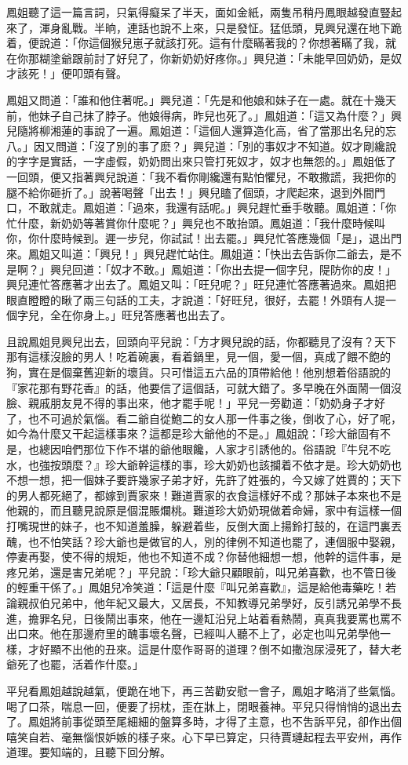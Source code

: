 鳳姐聽了這一篇言詞，只氣得癡呆了半天，面如金紙，兩隻吊稍丹鳳眼越發直豎起來了，渾身亂戰。半晌，連話也說不上來，只是發怔。猛低頭，見興兒還在地下跪着，便說道：「你這個猴兒崽子就該打死。這有什麼瞞著我的？你想著瞞了我，就在你那糊塗爺跟前討了好兒了，你新奶奶好疼你。」興兒道：「未能早回奶奶，是奴才該死！」便叩頭有聲。

鳳姐又問道：「誰和他住著呢。」興兒道：「先是和他娘和妹子在一處。就在十幾天前，他妹子自己抹了脖子。他娘得病，昨兒也死了。」鳳姐道：「這又為什麼？」興兒隨將柳湘蓮的事說了一遍。鳳姐道：「這個人還算造化高，省了當那出名兒的忘八。」因又問道：「沒了別的事了麽？」興兒道：「別的事奴才不知道。奴才剛纔說的字字是實話，一字虛假，奶奶問出來只管打死奴才，奴才也無怨的。」鳳姐低了一回頭，便又指著興兒說道：「我不看你剛纔還有點怕懼兒，不敢撒謊，我把你的腿不給你砸折了。」說著喝聲「出去！」興兒瞌了個頭，才爬起來，退到外間門口，不敢就走。鳳姐道：「過來，我還有話呢。」興兒趕忙垂手敬聽。鳳姐道：「你忙什麼，新奶奶等著賞你什麼呢？」興兒也不敢抬頭。鳳姐道：「我什麼時候叫你，你什麼時候到。遲一步兒，你試試！出去罷。」興兒忙答應幾個「是」，退出門來。鳳姐又叫道：「興兒！」興兒趕忙站住。鳳姐道：「快出去告訴你二爺去，是不是啊？」興兒回道：「奴才不敢。」鳳姐道：「你出去提一個字兒，隄防你的皮！」興兒連忙答應著才出去了。鳳姐又叫：「旺兒呢？」旺兒連忙答應著過來。鳳姐把眼直瞪瞪的瞅了兩三句話的工夫，才說道：「好旺兒，很好，去罷！外頭有人提一個字兒，全在你身上。」旺兒答應著也出去了。

且說鳳姐見興兒出去，回頭向平兒說：「方才興兒說的話，你都聽見了沒有？天下那有這樣沒臉的男人！吃着碗裏，看着鍋里，見一個，愛一個，真成了餵不飽的狗，實在是個棄舊迎新的壞貨。只可惜這五六品的頂帶給他！他別想着俗語說的『家花那有野花香』的話，他要信了這個話，可就大錯了。多早晚在外面鬧一個沒臉、親戚朋友見不得的事出來，他才罷手呢！」平兒一旁勸道：「奶奶身子才好了，也不可過於氣惱。看二爺自從鮑二的女人那一件事之後，倒收了心，好了呢，如今為什麼又干起這樣事來？這都是珍大爺他的不是。」鳳姐說：「珍大爺固有不是，也總因咱們那位下作不堪的爺他眼饞，人家才引誘他的。俗語說『牛兒不吃水，也強按頭麼？』珍大爺幹這樣的事，珍大奶奶也該攔着不依才是。珍大奶奶也不想一想，把一個妹子要許幾家子弟才好，先許了姓張的，今又嫁了姓賈的；天下的男人都死絕了，都嫁到賈家來！難道賈家的衣食這樣好不成？那妹子本來也不是他親的，而且聽見說原是個混賬爛桃。難道珍大奶奶現做着命婦，家中有這樣一個打嘴現世的妹子，也不知道羞臊，躲避着些，反倒大面上揚鈴打鼓的，在這門裏丟醜，也不怕笑話？珍大爺也是做官的人，別的律例不知道也罷了，連個服中娶親，停妻再娶，使不得的規矩，他也不知道不成？你替他細想一想，他幹的這件事，是疼兄弟，還是害兄弟呢？」平兒說：「珍大爺只顧眼前，叫兄弟喜歡，也不管日後的輕重干係了。」鳳姐兒冷笑道：「這是什麼『叫兄弟喜歡』，這是給他毒藥吃！若論親叔伯兄弟中，他年紀又最大，又居長，不知教導兄弟學好，反引誘兄弟學不長進，擔罪名兒，日後鬧出事來，他在一邊缸沿兒上站着看熱鬧，真真我要罵也罵不出口來。他在那邊府里的醜事壞名聲，已經叫人聽不上了，必定也叫兄弟學他一樣，才好顯不出他的丑來。這是什麼作哥哥的道理？倒不如撒泡尿浸死了，替大老爺死了也罷，活着作什麼。」

平兒看鳳姐越說越氣，便跪在地下，再三苦勸安慰一會子，鳳姐才略消了些氣惱。喝了口茶，喘息一回，便要了拐枕，歪在牀上，閉眼養神。平兒只得悄悄的退出去了。鳳姐將前事從頭至尾細細的盤算多時，才得了主意，也不吿訴平兒，卻作出個嘻笑自若、毫無惱恨妒嫉的樣子來。心下早已算定，只待賈璉起程去平安州，再作道理。要知端的，且聽下回分解。
